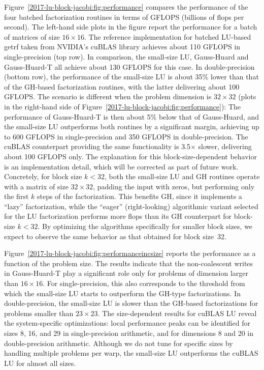 Figure~\ref{2017-lu-block-jacobi:fig:performance} compares the performance of the four
batched factorization routines in terms of GFLOPS (billions of flops per 
second).
The left-hand side plots in the figure report the performance
for a batch of matrices of size $16\times16$. 
The reference implementation for batched LU-based {\sc getrf} taken from NVIDIA's
cuBLAS library achieves about 110 GFLOPS in single-precision (top row).
In comparison, the small-size LU, Gauss-Huard and Gauss-Huard-T
all achieve about 130 GFLOPS for this case. In double-precision (bottom row), the performance
of the small-size LU is about 35\% lower than that of the GH-based
factorization routines, with the latter delivering about 100 GFLOPS. 
The scenario is different when the problem dimension is $32\times32$ (plots in the right-hand side of Figure~\ref{2017-lu-block-jacobi:fig:performance}):
The performance of Gauss-Huard-T is then about 5\% below that of Gauss-Huard,
and the small-size LU outperforms both routines by a significant margin, achieving up to
600 GFLOPS in single-precision and 350 GFLOPS in double-precision.
The cuBLAS counterpart providing the same functionality is 3.5$\times$ slower, delivering about 100 GFLOPS only.
The explanation for this block-size-dependent behavior
is an implementation detail, which will be corrected as part of future work.
Concretely, for block size $k < 32$, both the small-size LU and GH routines
operate with a matrix of size $32 \times 32$, padding the input with
zeros, but performing only the first $k$ steps of the factorization.
This benefits GH,
since it implements a ``lazy'' factorization,
while the ``eager'' (right-looking) algorithmic variant
selected for the LU factorization 
performs more flops than its GH counterpart for block-size $k<32$.
By optimizing the algorithms specifically for smaller block sizes,
we expect to observe the same behavior as that obtained for block size~32.

Figure~\ref{2017-lu-block-jacobi:fig:performanceincsize} reports the performance as a function of the problem size.
The results indicate that the non-coalescent writes in Gauss-Huard-T play a significant role only for 
problems of dimension larger than $16\times16$. For single-precision, 
this also corresponds  to the threshold from which
the small-size LU starts to outperform the GH-type factorizations. 
In double-precision, the small-size LU is slower than the GH-based factorizations
for problems smaller than $23\times23$.
The size-dependent results for cuBLAS LU reveal the system-specific optimizations:
local performance peaks can be identified for sizes 8, 16, and 
29 in single-precision arithmetic,
and for dimensions 8 and 20 in double-precision arithmetic. 
Although we do not tune for specific sizes by handling multiple problems per warp,
the small-size LU outperforms the cuBLAS LU for almost all sizes.


